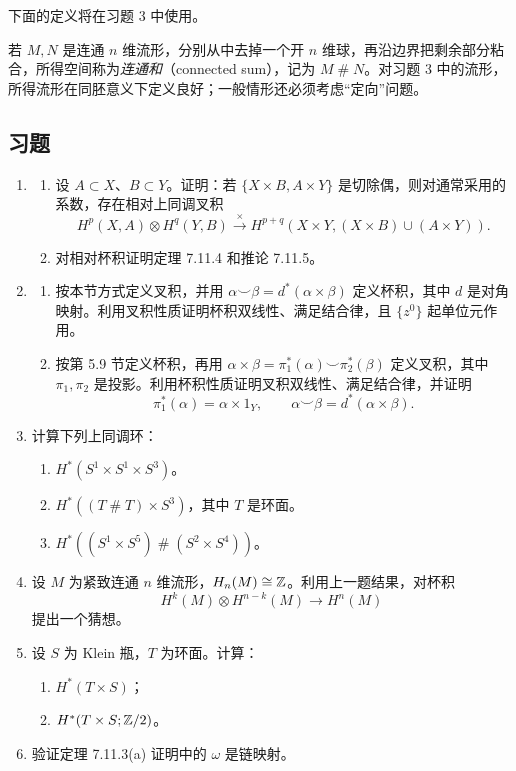 下面的定义将在习题 3 中使用。

若 $M,N$ 是连通 $n$ 维流形，分别从中去掉一个开 $n$ 维球，再沿边界把剩余部分粘合，所得空间称为\emph{连通和}（connected sum），记为 $M\mathbin{\#}N$。对习题 3 中的流形，所得流形在同胚意义下定义良好；一般情形还必须考虑“定向”问题。

\subsection*{习题}
\begin{enumerate}
\item \begin{enumerate}[label=(\alph*)]
\item 设 $A\subset X$、$B\subset Y$。证明：若 $\{X\times B,A\times Y\}$ 是切除偶，则对通常采用的系数，存在相对上同调叉积
\[H^p(X,A)\otimes H^q(Y,B)\xrightarrow{\times}
H^{p+q}(X\times Y,(X\times B)\cup(A\times Y)).\]
\item 对相对杯积证明定理 7.11.4 和推论 7.11.5。
\end{enumerate}
\item \begin{enumerate}[label=(\alph*)]
\item 按本节方式定义叉积，并用 $\alpha\smile\beta=d^*(\alpha\times\beta)$ 定义杯积，其中 $d$ 是对角映射。利用叉积性质证明杯积双线性、满足结合律，且 $\{z^0\}$ 起单位元作用。
\item 按第 5.9 节定义杯积，再用 $\alpha\times\beta=\pi_1^*(\alpha)\smile\pi_2^*(\beta)$ 定义叉积，其中 $\pi_1,\pi_2$ 是投影。利用杯积性质证明叉积双线性、满足结合律，并证明
\[\pi_1^*(\alpha)=\alpha\times1_Y,\qquad\alpha\smile\beta=d^*(\alpha\times\beta).\]
\end{enumerate}
\item 计算下列上同调环：
\begin{enumerate}[label=(\alph*)]
\item $H^*(S^1\times S^1\times S^3)$。
\item $H^*((T\mathbin{\#}T)\times S^3)$，其中 $T$ 是环面。
\item $H^*((S^1\times S^5)\mathbin{\#}(S^2\times S^4))$。
\end{enumerate}
\item 设 $M$ 为紧致连通 $n$ 维流形，$H_n(M)\cong\mathbb{Z}$。利用上一题结果，对杯积
\[H^k(M)\otimes H^{n-k}(M)\longrightarrow H^n(M)\]
提出一个猜想。
\item 设 $S$ 为 Klein 瓶，$T$ 为环面。计算：
\begin{enumerate}[label=(\alph*)]
\item $H^*(T\times S)$；\item $H^*(T\times S;\mathbb{Z}/2)$。
\end{enumerate}
\item 验证定理 7.11.3(a) 证明中的 $\omega$ 是链映射。
\end{enumerate}
